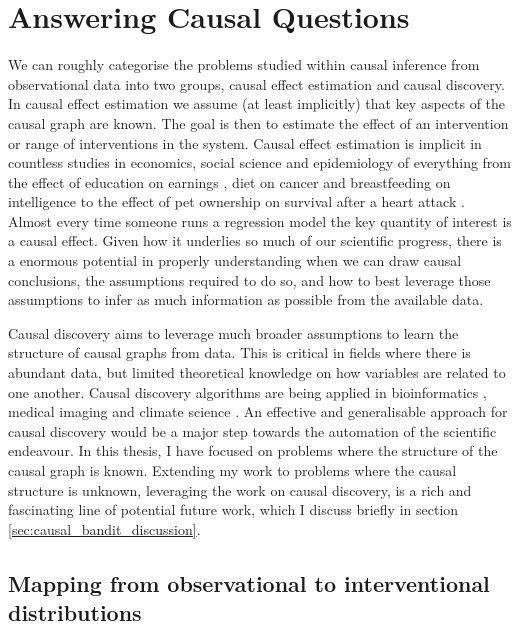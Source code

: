 \documentclass[11pt,a4paper,twoside]{report}
\theoremstyle{plain}
\theoremstyle{definition}
\begin{document}
\section{Answering Causal Questions} 
\label{sec:causal effect estimation}
We can roughly categorise the problems studied within causal inference from observational data into two groups, causal effect estimation and causal discovery. In causal effect estimation we assume (at least implicitly) that key aspects of the causal graph are known. The goal is then to estimate the effect of an intervention or range of interventions in the system. Causal effect estimation is implicit in countless studies in economics, social science and epidemiology of everything from the effect of education on earnings \citep{card1999causal}, diet on cancer \citep{bingham2004diet} and breastfeeding on intelligence \citep{jain2002good} to the effect of pet ownership on survival after a heart attack \citep{friedmann1995pet}. Almost every time someone runs a regression model the key quantity of interest is a causal effect. Given how it underlies so much of our scientific progress, there is a enormous potential in properly understanding when we can draw causal conclusions, the assumptions required to do so, and how to best leverage those assumptions to infer as much information as possible from the available data. 

Causal discovery aims to leverage much broader assumptions to learn the structure of causal graphs from data. This is critical in fields where there is abundant data, but limited theoretical knowledge on how variables are related to one another. Causal discovery algorithms are being applied in bioinformatics \citep{Bay2002,Sachs2005,Ram2006,Alekseyenko2011,Statnikov2012,Gao2015,Sokolova2015,Taruttis2015}, medical imaging \citep{Ramsey2010} and climate science \citep{Uphoff2013}. An effective and generalisable approach for causal discovery would be a major step towards the automation of the scientific endeavour. In this thesis, I have focused on problems where the structure of the causal graph is known. Extending my work to problems where the causal structure is unknown, leveraging the work on causal discovery, is a rich and fascinating line of potential future work, which I discuss briefly in section \ref{sec:causal_bandit_discussion}. 

\subsection{Mapping from observational to interventional distributions}
\end{document}
